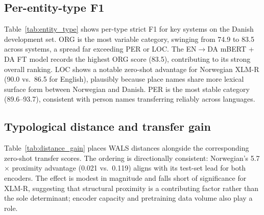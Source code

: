 \subsection{Per-entity-type F1}

Table~\ref{tab:entity_type} shows per-type strict F1 for key systems on the Danish development set. ORG is the most variable category, swinging from 74.9 to 83.5 across systems, a spread far exceeding PER or LOC. The EN$\rightarrow$DA mBERT + DA FT model records the highest ORG score (83.5), contributing to its strong overall ranking. LOC shows a notable zero-shot advantage for Norwegian XLM-R (90.0 vs.\ 86.5 for English), plausibly because place names share more lexical surface form between Norwegian and Danish. PER is the most stable category (89.6--93.7), consistent with person names transferring reliably across languages.

\begin{table}[t]
\centering
\small
{}
\caption{Per-entity-type strict F1 (\%) on Danish dev. MISC is excluded: those annotations reside in a secondary label column not read by training or evaluation code (see Section~\ref{sec:analysis}).}
\label{tab:entity_type}
\end{table}

\subsection{Typological distance and transfer gain}

Table~\ref{tab:distance_gain} places WALS distances alongside the corresponding zero-shot transfer scores. The ordering is directionally consistent: Norwegian's 5.7$\times$ proximity advantage (0.021 vs.\ 0.119) aligns with its test-set lead for both encoders. The effect is modest in magnitude and falls short of significance for XLM-R, suggesting that structural proximity is a contributing factor rather than the sole determinant; encoder capacity and pretraining data volume also play a role.

